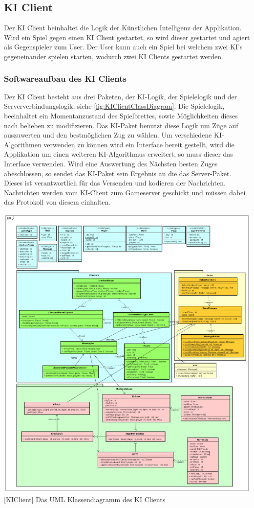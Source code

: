 \documentclass[12pt,a4paper,bibliography=totocnumbered,listof=totocnumbered]{article}
\begin{document}
\subsection{KI Client}
Der KI Client beinhaltet die Logik der Künstlichen Intelligenz der Applikation. Wird ein Spiel gegen einen KI Client gestartet, so wird dieser gestartet und agiert als 
Gegenspieler zum User. Der User kann auch ein Spiel bei welchem zwei KI's gegeneinander spielen starten, wodurch zwei KI Clients gestartet werden.

\subsubsection{Softwareaufbau des KI Clients}
Der KI Client besteht aus drei Paketen, der KI-Logik, der Spielelogik und der Serververbindungslogik, siehe \ref{fig:KIClientClassDiagram}. 
Die Spielelogik, beeinhaltet ein Momentanzustand des Spielbrettes, sowie Möglichkeiten dieses nach belieben zu modifizieren. Das KI-Paket benutzt diese Logik um 
Züge auf auszuwerten und den bestmöglichen Zug zu wählen. Um verschiedene KI-Algorithmen verwenden zu können wird ein Interface bereit gestellt, wird die Applikation 
um einen weiteren KI-Algorithmus erweitert, so muss dieser das Interface verwenden. Wird eine Auswertung des Nächsten besten Zuges abeschlossen, so sendet das KI-Paket sein
Ergebnis an die das Server-Paket. Dieses ist verantwortlich für das Versenden und kodieren der Nachrichten. Nachrichten werden vom KI-Client zum Gameserver geschickt und müssen
dabei das Protokoll von diesem einhalten.

\vspace{1em}
\begin{minipage}{\linewidth}
	\centering
	\includegraphics[width=0.9\linewidth]{pics/GameClientClassDiagram.png}
	[KIClient]{ Das UML Klassendiagramm des KI Clients }
	\label{fig:KIClientClassDiagram}
\end{minipage}
\end{document}
